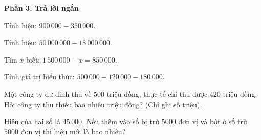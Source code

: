 \textbf{Phần 3. Trả lời ngắn}

\begin{ex} %
Tính hiệu: $900\,000 - 350\,000$.
\end{ex}

\begin{ex} %
Tính hiệu: $50\,000\,000 - 18\,000\,000$.
\end{ex}

\begin{ex} %
Tìm $x$ biết: $1\,500\,000 - x = 850\,000$.
\end{ex}

\begin{ex} %
Tính giá trị biểu thức: $500\,000 - 120\,000 - 180\,000$.
\end{ex}

\begin{ex} %
Một công ty dự định thu về $500$ triệu đồng, thực tế chỉ thu được $420$ triệu đồng. Hỏi công ty thu thiếu bao nhiêu triệu đồng? (Chỉ ghi số triệu).
\end{ex}

\begin{ex} %
Hiệu của hai số là $45\,000$. Nếu thêm vào số bị trừ $5000$ đơn vị và bớt ở số trừ $5000$ đơn vị thì hiệu mới là bao nhiêu?
\end{ex}
